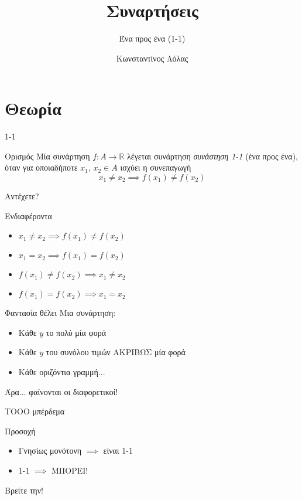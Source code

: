 \documentclass{presentation}
\title{Συναρτήσεις}
\subtitle{Ένα προς ένα (1-1)}
\author[Λόλας]{Κωνσταντίνος Λόλας }
\institute[$10^ο$ ΓΕΛ]{$10^ο$ ΓΕΛ Θεσσαλονίκης}
\date{}
\begin{document}
\begin{frame}
  \titlepage
\end{frame}

\section{Θεωρία}
\begin{frame}{1-1}
  \begin{block}{Ορισμός}
    Μία συνάρτηση $f:Α\to\mathbb{R}$ λέγεται συνάρτηση \emph{συνάστηση 1-1} (ένα προς ένα), όταν για οποιαδήποτε $x_1$, $x_2\in Α$ ισχύει η συνεπαγωγή
    $$x_1\ne x_2 \implies f(x_1)\ne f(x_2)$$
  \end{block}
\end{frame}

\begin{frame}{Αντέχετε?}
  \begin{exampleblock}{Ενδιαφέροντα}
    \begin{itemize}
      \item $x_1\ne x_2 \implies f(x_1)\ne f(x_2)$
      \item $x_1= x_2 \implies f(x_1)= f(x_2)$
      \item $f(x_1)\ne f(x_2) \implies x_1\ne x_2$
      \item $f(x_1)= f(x_2) \implies x_1= x_2$
    \end{itemize}
  \end{exampleblock}
\end{frame}

\begin{frame}{Φαντασία θέλει}
  Μια συνάρτηση:
  \begin{itemize}
    \item Κάθε $y$ το πολύ μία φορά \pause
    \item Κάθε $y$ του συνόλου τιμών ΑΚΡΙΒΩΣ μία φορά \pause
    \item Κάθε οριζόντια γραμμή...
  \end{itemize}
  Άρα... φαίνονται οι διαφορετικοί!
\end{frame}

\begin{frame}{ΤΟΟΟ μπέρδεμα}
  \begin{alertblock}{Προσοχή}
    \begin{itemize}
      \item Γνησίως μονότονη $\implies$ \pause είναι 1-1 \pause
      \item  1-1 $\implies$ \pause ΜΠΟΡΕΙ!
    \end{itemize}
  \end{alertblock}
  Βρείτε την!
\end{frame}
\end{document}
